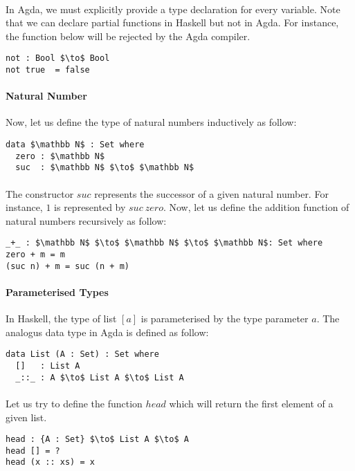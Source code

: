 \paragraph{} In Agda, we must explicitly provide a type declaration for every
variable. Note that we can declare partial
functions in Haskell but not in Agda. For instance, the function below
will be rejected by the Agda compiler.
\begin{lstlisting}[mathescape=true,xleftmargin=.3\textwidth]
not : Bool $\to$ Bool
not true  = false
\end{lstlisting}

\paragraph{Natural Number} Now, let us define the type of natural numbers
inductively as follow: 
\begin{lstlisting}[mathescape=true,xleftmargin=.3\textwidth]
data $\mathbb N$ : Set where
  zero : $\mathbb N$
  suc  : $\mathbb N$ $\to$ $\mathbb N$
\end{lstlisting} 

\paragraph{} The constructor \(suc\) represents the successor of a given
natural number. For instance, \(1\) is represented by \(suc\
zero\). Now, let us define the addition function of natural numbers recursively as follow:
\begin{lstlisting}[mathescape=true,xleftmargin=.3\textwidth]
_+_ : $\mathbb N$ $\to$ $\mathbb N$ $\to$ $\mathbb N$: Set where
zero + m = m
(suc n) + m = suc (n + m)
\end{lstlisting} 

\paragraph{Parameterised Types} In Haskell, the type of list \([a]\) is parameterised by the type
parameter \(a\). The analogus data type in Agda is defined as follow:
\begin{lstlisting}[mathescape=true,xleftmargin=.3\textwidth]
data List (A : Set) : Set where
  []   : List A
  _::_ : A $\to$ List A $\to$ List A
\end{lstlisting} 

\paragraph{} Let us try to define the function \(head\) which will
return the first element of a given list. 
\begin{lstlisting}[mathescape=true,xleftmargin=.3\textwidth]
head : {A : Set} $\to$ List A $\to$ A
head [] = ?
head (x :: xs) = x
\end{lstlisting} 

